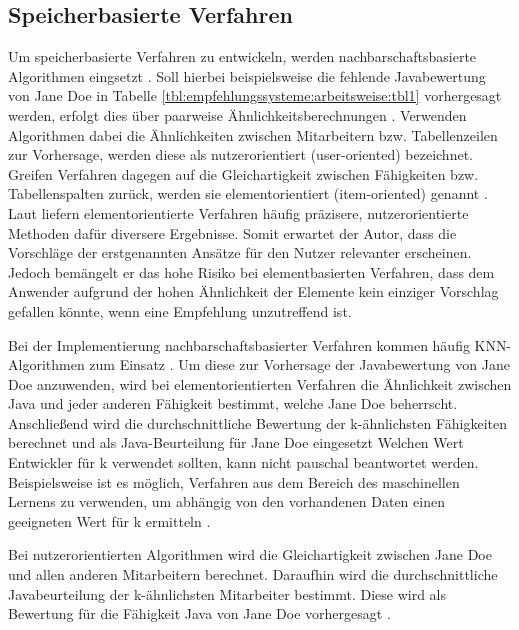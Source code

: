 \subsection{Speicherbasierte Verfahren}
\label{ch:empfehlungssysteme:cf:speicherbasiert}
Um speicherbasierte Verfahren zu entwickeln, werden nachbarschaftsbasierte Algorithmen eingsetzt \cite[S. 29]{recommenderSystems:2016}. Soll hierbei beispielsweise die fehlende Javabewertung von Jane Doe in Tabelle \ref{tbl:empfehlungssysteme:arbeitsweise:tbl1} vorhergesagt werden, erfolgt dies über paarweise Ähnlichkeitsberechnungen \cite[S. 2f.]{bharti:2019}. Verwenden Algorithmen dabei die Ähnlichkeiten zwischen Mitarbeitern bzw. Tabellenzeilen zur Vorhersage, werden diese als nutzerorientiert (user-oriented) bezeichnet. Greifen Verfahren dagegen auf die Gleichartigkeit zwischen Fähigkeiten bzw. Tabellenspalten zurück, werden sie elementorientiert (item-oriented) genannt \cite[S. 1f.]{duong:2018}. Laut \textcite[S. 42]{recommenderSystems:2016} liefern elementorientierte Verfahren häufig präzisere, nutzerorientierte Methoden dafür diversere Ergebnisse. Somit erwartet der Autor, dass die Vorschläge der erstgenannten Ansätze für den Nutzer relevanter erscheinen. Jedoch bemängelt er das hohe Risiko bei elementbasierten Verfahren, dass dem Anwender aufgrund der hohen Ähnlichkeit der Elemente kein einziger Vorschlag gefallen könnte, wenn eine Empfehlung unzutreffend ist.

Bei der Implementierung nachbarschaftsbasierter Verfahren kommen häufig \ac{KNN}-Algorithmen zum Einsatz \cite[S. 1]{nayak:2018}. Um diese zur Vorhersage der Javabewertung von Jane Doe anzuwenden, wird bei elementorientierten Verfahren die Ähnlichkeit zwischen Java und jeder anderen Fähigkeit bestimmt, welche Jane Doe beherrscht. Anschließend wird die durchschnittliche Bewertung der k-ähnlichsten Fähigkeiten berechnet und als Java-Beurteilung für Jane Doe eingesetzt \cite[S. 2]{hao:2013} Welchen Wert Entwickler für k verwendet sollten, kann nicht pauschal beantwortet werden. Beispielsweise ist es möglich, Verfahren aus dem Bereich des maschinellen Lernens zu verwenden, um abhängig von den vorhandenen Daten einen geeigneten Wert für k ermitteln \cite[S. 2f.]{jiang:2007}.

Bei nutzerorientierten Algorithmen wird die Gleichartigkeit zwischen Jane Doe und allen anderen Mitarbeitern berechnet. Daraufhin wird die durchschnittliche Javabeurteilung der k-ähnlichsten Mitarbeiter bestimmt. Diese wird als Bewertung für die Fähigkeit Java von Jane Doe vorhergesagt \cite[S. 2f.]{hao:2013}.

